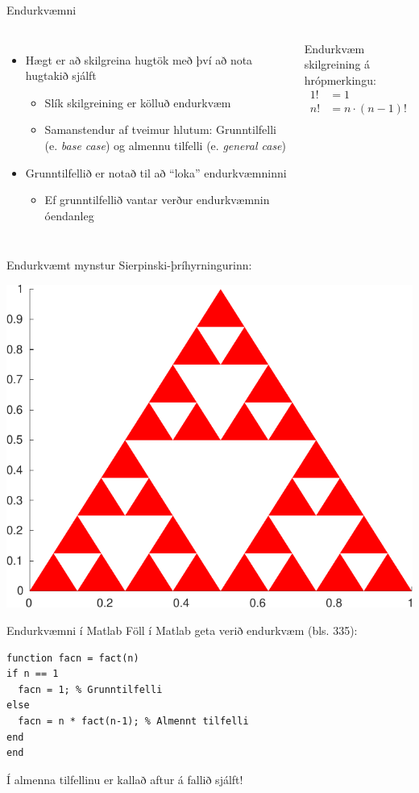 \documentclass{beamer}
\begin{document}
\begin{frame}[fragile]{Endurkvæmni}
\begin{columns}
\begin{itemize}
 \item Hægt er að skilgreina hugtök með því að nota hugtakið sjálft
 \begin{itemize}
  \item Slík skilgreining er kölluð endurkvæm
  \item Samanstendur af tveimur hlutum: Grunntilfelli (e. \emph{base case}) og almennu tilfelli (e. \emph{general case})
 \end{itemize}
 \item Grunntilfellið er notað til að ``loka'' endurkvæmninni
 \begin{itemize}
  \item Ef grunntilfellið vantar verður endurkvæmnin óendanleg
 \end{itemize}
\end{itemize}

\vspace{0.1cm}
Endurkvæm skilgreining á hrópmerkingu:
\begin{align*}
1! &= 1\\
n! &= n\cdot(n-1)!\\
\end{align*}

\end{columns}
\end{frame}

\begin{frame}{Endurkvæmt mynstur}
Sierpinski-þríhyrningurinn:
\begin{center}
\includegraphics[width=0.6\linewidth]{../Pics/sierpinski}
\end{center}
\end{frame}

\begin{frame}[fragile]{Endurkvæmni í Matlab}
Föll í Matlab geta verið endurkvæm (bls. 335):
\begin{verbatim}
function facn = fact(n)
if n == 1
  facn = 1; % Grunntilfelli
else
  facn = n * fact(n-1); % Almennt tilfelli
end
end
\end{verbatim}
Í almenna tilfellinu er kallað aftur á fallið sjálft!
\end{frame}
\end{document}

